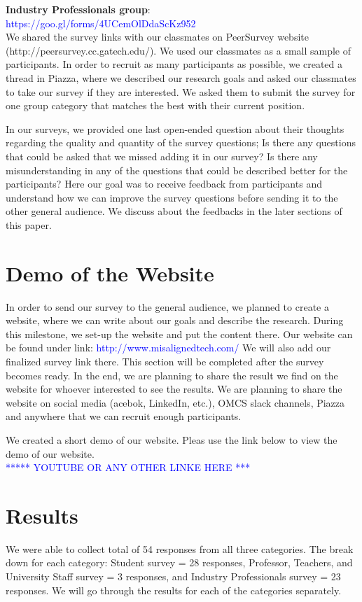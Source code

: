 \documentclass{sigchi}
\begin{document}
\textbf{Industry Professionals group}:\\  \textcolor{blue}{https://goo.gl/forms/4UCemOlDdaScKz952}\\

We shared the survey links with our classmates on PeerSurvey website (http://peersurvey.cc.gatech.edu/). We used our classmates as a small sample of participants. In order to recruit as many participants as possible, we created a thread in Piazza, where we described our research goals and asked our classmates to take our survey if they are interested. We asked them to submit the survey for one group category that matches the best with their current position. 

In our surveys, we provided one last open-ended question about their thoughts regarding the quality and quantity of the survey questions; Is there any questions that could be asked that we missed adding it in our survey? Is there any misunderstanding in any of the questions that could be described better for the participants? Here our goal was to receive feedback from participants and understand how we can improve the survey questions before sending it to the other general audience. We discuss about the feedbacks in the later sections of this paper.

\section{Demo of the Website}
In order to send our survey to the general audience, we planned to create a website, where we can write about our goals and describe the research. During this milestone, we set-up the website and put the content there. Our website can be found under link: \textcolor{blue}{http://www.misalignedtech.com/}
We will also add our finalized survey link there. This section will be completed after the survey becomes ready. In the end, we are planning to share the result we find on the website for whoever interested to see the results. We are planning to share the website on social media (acebok, LinkedIn, etc.), OMCS slack channels, Piazza and anywhere that we can recruit enough participants.

We created a short demo of our website. Pleas use the link below to view the demo of our website.\\
\textcolor{blue}{***** YOUTUBE OR ANY OTHER LINKE HERE ***}

\section{Results}
We were able to collect total of 54 responses from all three categories. The break down for each category: Student survey = 28 responses, Professor, Teachers, and University Staff survey = 3 responses, and Industry Professionals survey = 23 responses.
We will go through the results for each of the categories separately.
\end{document}
